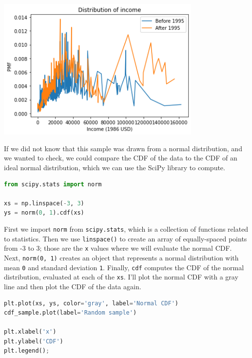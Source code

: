 \begin{center}
\includegraphics[width=4in]{chapters/08_distributions_files/08_distributions_102_0.png}
\end{center}

If we did not know that this sample was drawn from a normal
distribution, and we wanted to check, we could compare the CDF of the
data to the CDF of an ideal normal distribution, which we can use the
SciPy library to compute.

\begin{lstlisting}[language=Python,style=source]
from scipy.stats import norm

xs = np.linspace(-3, 3)
ys = norm(0, 1).cdf(xs)
\end{lstlisting}

First we import \passthrough{\lstinline!norm!} from
\passthrough{\lstinline!scipy.stats!}, which is a collection of
functions related to statistics. Then we use
\passthrough{\lstinline!linspace()!} to create an array of
equally-spaced points from -3 to 3; those are the
\passthrough{\lstinline!x!} values where we will evaluate the normal
CDF. Next, \passthrough{\lstinline!norm(0, 1)!} creates an object that
represents a normal distribution with mean \passthrough{\lstinline!0!}
and standard deviation \passthrough{\lstinline!1!}. Finally,
\passthrough{\lstinline!cdf!} computes the CDF of the normal
distribution, evaluated at each of the \passthrough{\lstinline!xs!}.
I'll plot the normal CDF with a gray line and then plot the CDF of the
data again.

\begin{lstlisting}[language=Python,style=source]
plt.plot(xs, ys, color='gray', label='Normal CDF')
cdf_sample.plot(label='Random sample')

plt.xlabel('x')
plt.ylabel('CDF')
plt.legend();
\end{lstlisting}

